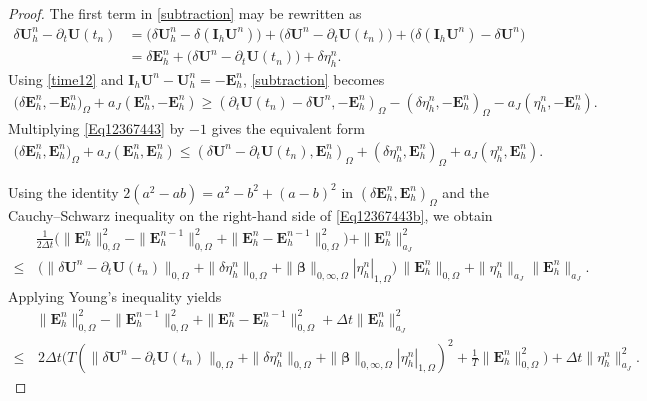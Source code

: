 \documentclass[final,12pt]{amsart}
\theoremstyle{plain}
\theoremstyle{definition}
\newcommand\bbeta{{\boldsymbol{\beta}}}
\newcommand\bU{\mathbf{U}}
\newcommand\bE{\mathbf{E}}
\begin{document}
\begin{proof}
The first term in \eqref{subtraction} may be rewritten as
\begin{align}
	\delta \bU^{n}_{h}-\partial_{t} \bU(t_{n})
	&=\big(\delta \bU^{n}_{h}- \delta(\mathbf{I}_{h}\bU^{n})\big)
	+\big(\delta\bU^{n}-\partial_{t} \bU(t_{n})\big)
	+\big(\delta(\mathbf{I}_{h}\bU^{n})-\delta\bU^{n}\big)\nonumber\\
	&= \delta \bE^{n}_{h}+\big(\delta\bU^{n}-\partial_{t} \bU(t_{n})\big)+\delta \eta^{n}_{h}. \label{time12}
\end{align}
Using \eqref{time12} and $\mathbf I_h\bU^n-\bU_h^n=-\bE_h^n$, \eqref{subtraction} becomes
\begin{align}\label{Eq12367443}
	\big(\delta \bE^{n}_{h}, -\bE^{n}_{h}\big)_{\Omega}+a_{J}(\bE^{n}_{h},-\bE^{n}_{h})
	\geq
	(\partial_{t} \bU(t_{n})-\delta \bU^{n},-\bE^{n}_{h})_{\Omega}
	-(\delta \eta^{n}_{h}, -\bE^{n}_{h})_{\Omega}
	-a_{J}( \eta^{n}_{h}, -\bE^{n}_{h}).
\end{align}
Multiplying \eqref{Eq12367443} by $-1$ gives the equivalent form
\begin{align}\label{Eq12367443b}
	\big(\delta \bE^{n}_{h}, \bE^{n}_{h}\big)_{\Omega}+a_{J}(\bE^{n}_{h},\bE^{n}_{h})
	\leq
	(\delta \bU^{n}-\partial_{t} \bU(t_{n}),\bE^{n}_{h})_{\Omega}
	+(\delta \eta^{n}_{h}, \bE^{n}_{h})_{\Omega}
	+a_{J}( \eta^{n}_{h}, \bE^{n}_{h}).
\end{align}

Using the identity $2(a^{2}-ab)=a^{2}-b^{2}+(a-b)^{2}$ in $(\delta\bE_h^n,\bE_h^n)_\Omega$ and the Cauchy--Schwarz inequality on the right-hand side of \eqref{Eq12367443b}, we obtain
\begin{align*}
	&\frac{1}{2\Delta t}\Big(\|\bE_h^n \|_{0,\Omega}^2-\| \bE_h^{n-1}\|_{0,\Omega}^2+\|\bE_h^n - \bE_h^{n-1}\|_{0,\Omega}^2\Big)
	+ \|\bE_h^n\|_{a_J}^2\\
	\leq&\, \Big(\|\delta \bU^{n}-\partial_{t}\bU(t_n)\|_{0,\Omega}+\|\delta\eta_h^n\|_{0,\Omega}
	+\|\bbeta\|_{0,\infty,\Omega} |\eta_h^n|_{1,\Omega}\Big)\, \|\bE_h^n\|_{0,\Omega} + \|\eta_h^n\|_{a_J} \|\bE_h^n\|_{a_J}.
\end{align*}
Applying Young's inequality yields
\begin{align*}
	&\|\bE_h^n \|_{0,\Omega}^2-\| \bE_h^{n-1}\|_{0,\Omega}^2+\|\bE_h^n - \bE_h^{n-1}\|_{0,\Omega}^2
	+ \Delta t \|\bE_h^n\|_{a_J}^{2}\\
	\leq&\,  2\Delta t\Big(T(\|\delta \bU^{n}-\partial_{t}\bU(t_n)\|_{0,\Omega}+\|\delta\eta_h^n\|_{0,\Omega}
	+\|\bbeta\|_{0,\infty,\Omega} |\eta_h^n|_{1,\Omega})^2+\frac{1}{T}\|\bE_h^n\|_{0,\Omega}^2\Big)
	+\Delta t \| \eta_h^n\|_{a_J}^{2}.
\end{align*}


\end{proof}
\end{document}
